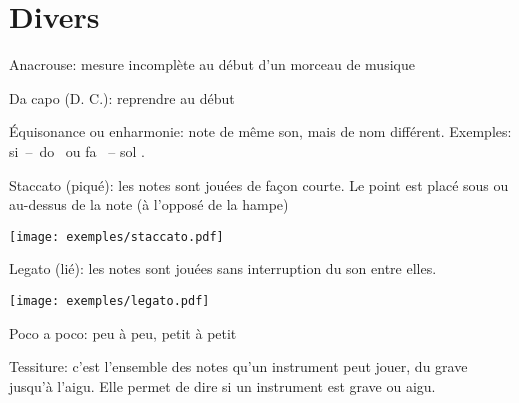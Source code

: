 \documentclass[11pt,a4paper]{scrreprt}
\begin{document}
\section{Divers}
\begin{description}
\item Anacrouse: mesure incomplète au début d'un morceau de musique
\item Da capo (D. C.): reprendre au début 
\item Équisonance ou enharmonie: note de même son, mais de nom différent. Exemples: si~--~do~\fetaflat{} ou fa~\fetasharp{} -- sol \fetaflat.
\item Staccato (piqué): les notes sont jouées de façon courte. Le point est placé sous ou au-dessus de la note (à l'opposé de la hampe)
\item \texttt{[image: exemples/staccato.pdf]}
\item Legato (lié): les notes sont jouées sans interruption du son entre elles.
\item \texttt{[image: exemples/legato.pdf]}
\item Poco a poco: peu à peu, petit à petit
\item Tessiture: c'est l'ensemble des notes qu'un instrument peut jouer, du grave jusqu'à l'aigu. Elle permet de dire si un instrument est grave ou aigu.
\end{description}
\newpage
{}
\printindex
\end{document}
